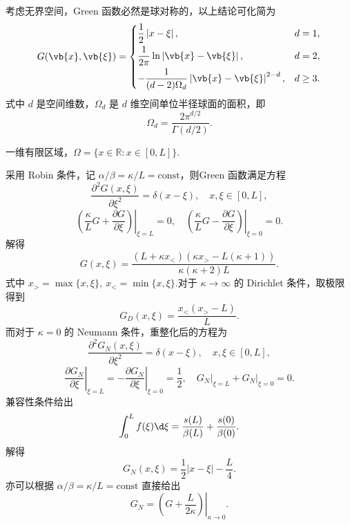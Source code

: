 考虑无界空间，Green 函数必然是球对称的，以上结论可化简为
\begin{equation*}
	G(\vb{x},\vb{\xi})=
	\begin{cases}
		\dfrac{1}{2}\left|x-\xi\right|, & d=1,\\[6pt]
		\dfrac{1}{2\pi}\ln\left|\vb{x}-\vb{\xi}\right|, & d=2,\\[6pt]
		-\dfrac{1}{(d-2)\Omega_d}\left|\vb{x}-\vb{\xi}\right|^{2-d}, & d\geq3.
	\end{cases}
\end{equation*}
式中 \(d\) 是空间维数，\(\Omega_d\) 是 \(d\) 维空间单位半径球面的面积，即
\begin{equation*}
	\Omega_d=\frac{2\pi^{d/2}}{\Gamma(d/2)}.
\end{equation*}

\begin{example}
	一维有限区域，\(\Omega=\{x\in\mathbb{R}:x\in[0,L]\}\).
	
	采用 Robin 条件，记 \(\alpha/\beta=\kappa/L=\mathrm{const}\)，则Green 函数满足方程
	\begin{equation*}
		\frac{\partial^2G(x,\xi)}{\partial\xi^2}=\delta(x-\xi),\quad x,\xi\in[0,L],
	\end{equation*}
	\begin{equation*}
		\left.\left(\frac{\kappa}{L}G+\frac{\partial G}{\partial\xi}\right)\right|_{\xi=L}=0,
		\quad
		\left.\left(\frac{\kappa}{L}G-\frac{\partial G}{\partial\xi}\right)\right|_{\xi=0}=0.
	\end{equation*}
	解得
	\begin{equation*}
		G(x,\xi)=\frac{(L+\kappa x_<)(\kappa x_>-L(\kappa+1))}{\kappa(\kappa+2)L}.
	\end{equation*}
	式中 \(x_>=\max\{x,\xi\},\ x_<=\min\{x,\xi\}\).对于 \(\kappa\to\infty\) 的 Dirichlet 条件，取极限得到
	\begin{equation*}
		G_D(x,\xi)=\frac{x_<(x_>-L)}{L}.
	\end{equation*}
	而对于 \(\kappa=0\) 的 Neumann 条件，重整化后的方程为
	\begin{equation*}
		\frac{\partial^2G_N(x,\xi)}{\partial\xi^2}=\delta(x-\xi),\quad x,\xi\in[0,L],
	\end{equation*}
	\begin{equation*}
		\left.\frac{\partial G_N}{\partial\xi}\right|_{\xi=L}
		=-\left.\frac{\partial G_N}{\partial\xi}\right|_{\xi=0}
		=\frac{1}{2},\quad
		\left.G_N\right|_{\xi=L}+\left.G_N\right|_{\xi=0}=0.
	\end{equation*}
	兼容性条件给出
	\begin{equation*}
		\int_0^L f(\xi)\d\xi=\frac{s(L)}{\beta(L)}+\frac{s(0)}{\beta(0)}.
	\end{equation*}
	解得
	\begin{equation*}
		G_N(x,\xi)=\frac{1}{2}\left|x-\xi\right|-\frac{L}{4}.
	\end{equation*}
	亦可以根据 \(\alpha/\beta=\kappa/L=\mathrm{const}\) 直接给出
	\begin{equation*}
		G_N=\left.\left(G+\frac{L}{2\kappa}\right)\right|_{\kappa\to0}.
	\end{equation*}
\end{example}

